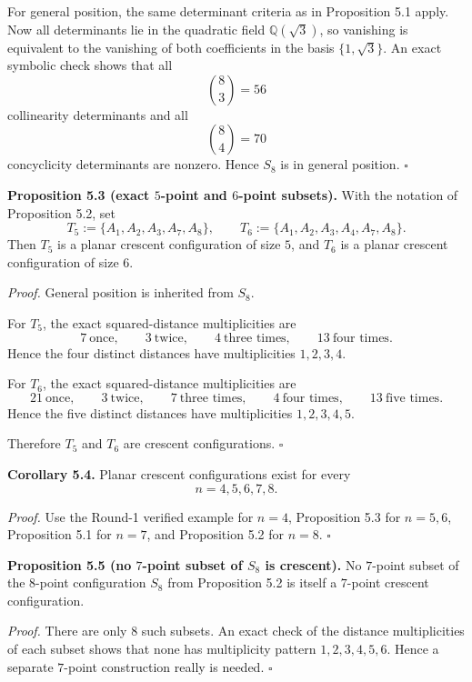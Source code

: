 For general position, the same determinant criteria as in Proposition 5.1 apply. Now all determinants lie in the quadratic field $\mathbb{Q}(\sqrt3)$, so vanishing is equivalent to the vanishing of both coefficients in the basis $\{1,\sqrt3\}$. An exact symbolic check shows that all
\[
\binom83=56
\]
collinearity determinants and all
\[
\binom84=70
\]
concyclicity determinants are nonzero. Hence $S_8$ is in general position.
\hfill$\square$

\medskip
\noindent\textbf{Proposition 5.3 (exact $5$-point and $6$-point subsets).}
With the notation of Proposition 5.2, set
\[
T_5:=\{A_1,A_2,A_3,A_7,A_8\},
\qquad
T_6:=\{A_1,A_2,A_3,A_4,A_7,A_8\}.
\]
Then $T_5$ is a planar crescent configuration of size $5$, and $T_6$ is a planar crescent configuration of size $6$.

\smallskip
\noindent\emph{Proof.}
General position is inherited from $S_8$.

For $T_5$, the exact squared-distance multiplicities are
\[
7 \ \mbox{once},\qquad 3 \ \mbox{twice},\qquad 4 \ \mbox{three times},\qquad 13 \ \mbox{four times}.
\]
Hence the four distinct distances have multiplicities $1,2,3,4$.

For $T_6$, the exact squared-distance multiplicities are
\[
21 \ \mbox{once},\qquad 3 \ \mbox{twice},\qquad 7 \ \mbox{three times},\qquad 4 \ \mbox{four times},\qquad 13 \ \mbox{five times}.
\]
Hence the five distinct distances have multiplicities $1,2,3,4,5$.

Therefore $T_5$ and $T_6$ are crescent configurations.
\hfill$\square$

\medskip
\noindent\textbf{Corollary 5.4.}
Planar crescent configurations exist for every
\[
n=4,5,6,7,8.
\]

\smallskip
\noindent\emph{Proof.}
Use the Round-1 verified example for $n=4$, Proposition 5.3 for $n=5,6$, Proposition 5.1 for $n=7$, and Proposition 5.2 for $n=8$.
\hfill$\square$

\medskip
\noindent\textbf{Proposition 5.5 (no $7$-point subset of $S_8$ is crescent).}
No $7$-point subset of the $8$-point configuration $S_8$ from Proposition 5.2 is itself a $7$-point crescent configuration.

\smallskip
\noindent\emph{Proof.}
There are only $8$ such subsets. An exact check of the distance multiplicities of each subset shows that none has multiplicity pattern $1,2,3,4,5,6$. Hence a separate $7$-point construction really is needed.
\hfill$\square$

